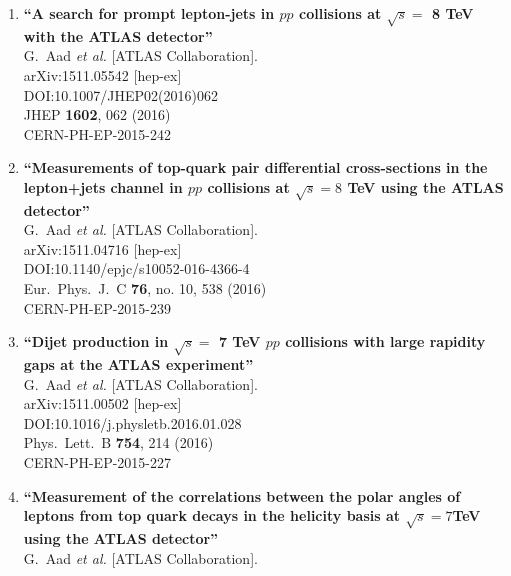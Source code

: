 \documentclass{article}
\begin{document}
\begin{enumerate}
\item%
{\bf ``A search for prompt lepton-jets in $pp$ collisions at $\sqrt{s}=$ 8 TeV with the ATLAS detector''}
  \\{}G.~Aad {\it et al.} [ATLAS Collaboration].
  \\{}arXiv:1511.05542 [hep-ex]
  \\{}DOI:10.1007/JHEP02(2016)062
  \\{}JHEP {\bf 1602}, 062 (2016)
  \\{}CERN-PH-EP-2015-242
\item%
{\bf ``Measurements of top-quark pair differential cross-sections in the lepton+jets channel in $pp$ collisions at $\sqrt{s}=8$ TeV using the ATLAS detector''}
  \\{}G.~Aad {\it et al.} [ATLAS Collaboration].
  \\{}arXiv:1511.04716 [hep-ex]
  \\{}DOI:10.1140/epjc/s10052-016-4366-4
  \\{}Eur.\ Phys.\ J.\ C {\bf 76}, no. 10, 538 (2016)
  \\{}CERN-PH-EP-2015-239
\item%
{\bf ``Dijet production in $\sqrt{s}=$ 7 TeV $pp$ collisions with large rapidity gaps at the ATLAS experiment''}
  \\{}G.~Aad {\it et al.} [ATLAS Collaboration].
  \\{}arXiv:1511.00502 [hep-ex]
  \\{}DOI:10.1016/j.physletb.2016.01.028
  \\{}Phys.\ Lett.\ B {\bf 754}, 214 (2016)
  \\{}CERN-PH-EP-2015-227
\item%
{\bf ``Measurement of the correlations between the polar angles of leptons from top quark decays in the helicity basis at $\sqrt{s}=7$TeV using the ATLAS detector''}
  \\{}G.~Aad {\it et al.} [ATLAS Collaboration].

\end{enumerate}
\end{document}
